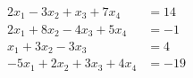 \begin{align*}
2x_1-3x_2+x_3+7x_4&=14\\
2x_1+8x_2-4x_3+5x_4&=-1\\
x_1+3x_2-3x_3&=4 \\
-5x_1+2x_2+3x_3+4x_4&=-19
\end{align*}
